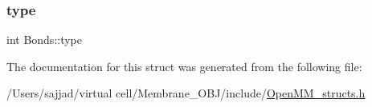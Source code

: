 \mbox{\label{structBonds_a888b86b64e111ca2c1cdc57ab3f1e575}} 
\subsubsection{\texorpdfstring{type}{type}}
{\footnotesize\ttfamily int Bonds\+::type}



The documentation for this struct was generated from the following file\+:\begin{DoxyCompactItemize}
\item 
/\+Users/sajjad/virtual cell/\+Membrane\+\_\+\+O\+B\+J/include/\mbox{\hyperlink{OpenMM__structs_8h}{Open\+M\+M\+\_\+structs.\+h}}\end{DoxyCompactItemize}
